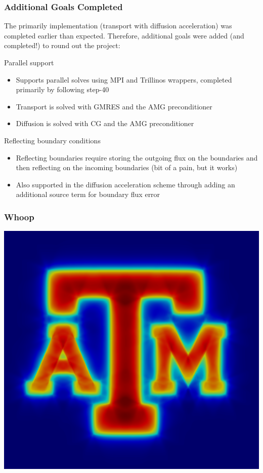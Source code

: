 \documentclass[xcolor={usenames,dvipsnames,svgnames,table}, 10pt]{beamer}
\begin{document}
\begin{frame}\frametitle{Additional Goals Completed}
	The primarily implementation (transport with diffusion acceleration) was completed earlier than expected. Therefore, additional goals were added (and completed!) to round out the project:
	\vfill
	\begin{block}{Parallel support}
		\begin{itemize}
			\item Supports parallel solves using MPI and Trillinos wrappers, completed primarily by following step-40
			\item Transport is solved with GMRES and the AMG preconditioner
			\item Diffusion is solved with CG and the AMG preconditioner
		\end{itemize}
	\end{block}
	\vfill
	\begin{block}{Reflecting boundary conditions}
		\begin{itemize}
			\item Reflecting boundaries require storing the outgoing flux on the boundaries and then reflecting on the incoming boundaries (bit of a pain, but it works)
			\item Also supported in the diffusion acceleration scheme through adding an additional source term for boundary flux error
		\end{itemize}
	\end{block}
\end{frame}


\begin{frame}\frametitle{Whoop}
	\vfill
	\centering
	\includegraphics[width=0.6\linewidth]{images/atm}
	\vfill
\end{frame}
\end{document}
